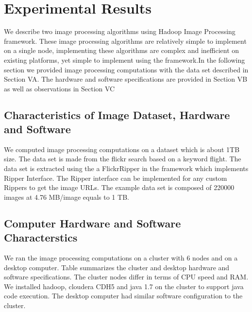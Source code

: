 \documentclass[conference]{IEEEtran}
\begin{document}
\section{Experimental Results}

We describe two image processing algorithms using Hadoop Image Processing framework. These image processing algorithms are relatively simple to implement on a single node, implementing these algorithms are complex and inefficient on existing platforms, yet simple to implement using the framework.In the following section we provided image processing computations with the data set described in Section VA. The hardware and software specifications are provided in Section VB as well as observations in Section VC 




\subsection{Characteristics of Image Dataset, Hardware and Software}
We computed image processing computations on a dataset which is about 1TB size. The data set is made from the flickr search based on a keyword flight. The data set is extracted using the a FlickrRipper in the framework which implements Ripper Interface. The Ripper interface can be implemented for any custom Rippers to get the image URLs. The example data set is composed of 220000 images at 4.76 MB/image equals to 1 TB.  

\subsection{Computer Hardware and Software Characterstics}
We ran the image processing computations on a cluster with 6 nodes and on a desktop computer. Table summarizes the cluster and desktop hardware and software specifications. The cluster nodes differ in terms of CPU speed and RAM. We installed hadoop, cloudera CDH5 and java 1.7 on the cluster to support java code execution. The desktop computer had similar software configuration to the cluster.
\end{document}
